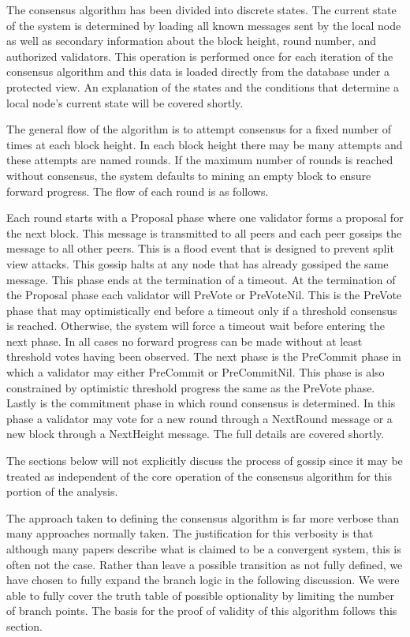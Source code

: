 The consensus algorithm has been divided into discrete states.
The current state of the system is determined by loading all known
messages sent by the local node as well as secondary information about
the block height, round number, and authorized validators.
This operation is performed once for each iteration of the consensus
algorithm and this data is loaded directly from the database under a
protected view.
An explanation of the states and the conditions that determine a local
node’s current state will be covered shortly.

The general flow of the algorithm is to attempt consensus for a fixed
number of times at each block height.
In each block height there may be many attempts and these attempts are
named rounds.
If the maximum number of rounds is reached without consensus, the
system defaults to mining an empty block to ensure forward progress.
The flow of each round is as follows.

Each round starts with a Proposal phase where one validator forms a
proposal for the next block.
This message is transmitted to all peers and each peer gossips the
message to all other peers.
This is a flood event that is designed to prevent split view attacks.
This gossip halts at any node that has already gossiped the same
message.
This phase ends at the termination of a timeout.
At the termination of the Proposal phase each validator will PreVote or
PreVoteNil.
This is the PreVote phase that may optimistically end before a timeout
only if a threshold consensus is reached.
Otherwise, the system will force a timeout wait before entering the
next phase.
In all cases no forward progress can be made without at least threshold
votes having been observed.
The next phase is the PreCommit phase in which a validator may either
PreCommit or PreCommitNil.
This phase is also constrained by optimistic threshold progress the
same as the PreVote phase.
Lastly is the commitment phase in which round consensus is determined.
In this phase a validator may vote for a new round through a NextRound
message or a new block through a NextHeight message.
The full details are covered shortly.

The sections below will not explicitly discuss the process of gossip
since it may be treated as independent of the core operation of the
consensus algorithm for this portion of the analysis.

The approach taken to defining the consensus algorithm is far more
verbose than many approaches normally taken.
The justification for this verbosity is that although many papers
describe what is claimed to be a convergent system, this is often not
the case.
Rather than leave a possible transition as not fully defined, we have
chosen to fully expand the branch logic in the following discussion.
We were able to fully cover the truth table of possible optionality by
limiting the number of branch points.
The basis for the proof of validity of this algorithm follows this
section.


